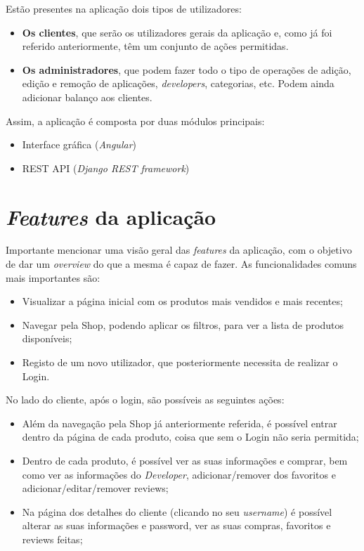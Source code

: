 \documentclass[10pt,english]{article}
\begin{document}
\par Estão presentes na aplicação dois tipos de utilizadores:
\begin{itemize}
  \item \textbf{Os clientes}, que serão os utilizadores gerais da aplicação e, como já foi referido anteriormente, têm um conjunto de ações permitidas.
  \item \textbf{Os administradores}, que podem fazer todo o tipo de operações de adição, edição e remoção de aplicações, \textit{developers}, categorias, etc. Podem ainda adicionar balanço aos clientes.
\end{itemize}
  
\par Assim, a aplicação é composta por duas módulos principais:
\begin{itemize}
  \item Interface gráfica (\textit{Angular})
  \item REST API (\textit{Django REST framework})
\end{itemize}

\newpage

\section{\textit{Features} da aplicação}

\par Importante mencionar uma visão geral das \textit{features} da aplicação, com o objetivo de dar um \textit{overview} do que a mesma é capaz de fazer. As funcionalidades comuns mais importantes são:

\begin{itemize}
    \item Visualizar a página inicial com os produtos mais vendidos e mais recentes;
    \item Navegar pela Shop, podendo aplicar os filtros, para ver a lista de produtos disponíveis;
    \item Registo de um novo utilizador, que posteriormente necessita de realizar o Login.
\end{itemize}

\par No lado do cliente, após o login, são possíveis as seguintes ações:

\begin{itemize}
    \item Além da navegação pela Shop já anteriormente referida, é possível entrar dentro da página de cada produto, coisa que sem o Login não seria permitida;
    \item Dentro de cada produto, é possível ver as suas informações e comprar, bem como ver as informações do \textit{Developer}, adicionar/remover dos favoritos e adicionar/editar/remover reviews;
    \item Na página dos detalhes do cliente (clicando no seu \textit{username}) é possível alterar as suas informações e password, ver as suas compras, favoritos e reviews feitas;
\end{itemize}
\end{document}
